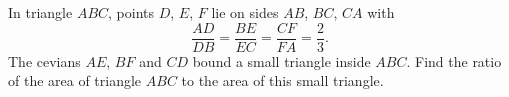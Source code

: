 In triangle $ABC$, points $D$, $E$, $F$ lie on sides $AB$, $BC$, $CA$ with
\[\dfrac{AD}{DB}=\dfrac{BE}{EC}=\dfrac{CF}{FA}=\dfrac23.\]
The cevians $AE$, $BF$ and $CD$ bound a small triangle inside $ABC$. Find the ratio of the area of triangle $ABC$ to the area of this small triangle.
